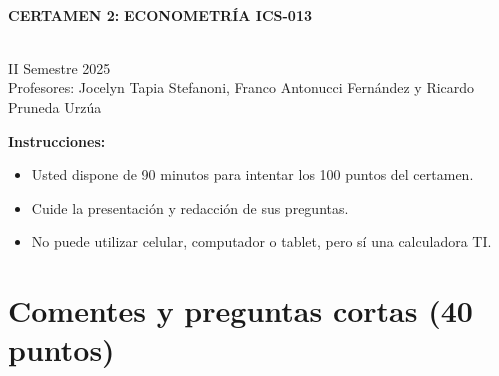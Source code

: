 \documentclass[10pt,a4paper]{article}
\begin{document}
\vspace{5cm}



\begin{center}
\begin{large}
\textbf{\\CERTAMEN 2:}\textbf{ ECONOMETRÍA ICS-013}
\end{large}\\
\vspace{0.2cm}
II Semestre 2025\\
Profesores: Jocelyn Tapia Stefanoni, Franco Antonucci Fernández y Ricardo Pruneda Urz\'ua\\
\end{center}

\textbf{Instrucciones:} 

\begin{itemize}

    \item Usted dispone de 90 minutos  para intentar los 100 puntos del certamen.
    \item Cuide la presentación y redacción de sus preguntas.
    \item No puede utilizar celular, computador o tablet, pero sí una calculadora TI.
     
\end{itemize}

\section{Comentes y preguntas cortas (40 puntos)}
\end{document}
